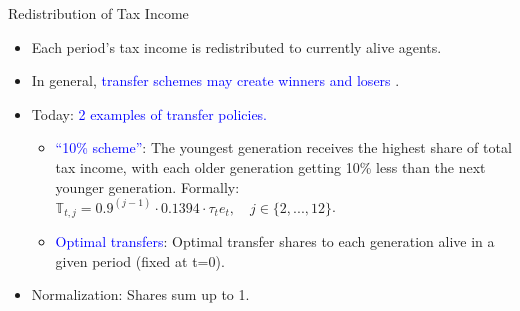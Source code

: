 \documentclass[aspectratio=1610]{beamer}
\begin{document}
\begin{frame}[fragile]{Redistribution of Tax Income}
    \begin{itemize}
        \item Each period's tax income is redistributed to currently alive agents.
        \item In general, \textcolor{blue}{transfer schemes may create winners and losers} \citep{kotlikoff2021making}.

        \item Today: \textcolor{blue}{2 examples of transfer policies.}
        \begin{itemize}
            \item \textcolor{blue}{``10\% scheme''}: The youngest generation receives the highest share of total tax income, with each older generation getting 10\% less than the next younger generation. Formally: $\mathbb{T}_{t,j} = 0.9^{(j-1)} \cdot 0.1394 \cdot \tau_t e_t, \quad j \in \{2,...,12 \}$.
         \vspace{0.5cm}
    \item \textcolor{blue}{Optimal transfers}: Optimal transfer shares to each generation alive in a given period (fixed at t=0).
\end{itemize}
\end{itemize}



        \begin{itemize}
        \vspace{0.5cm}
        \item Normalization: Shares sum up to 1.
    \end{itemize}
\end{frame}
\end{document}
